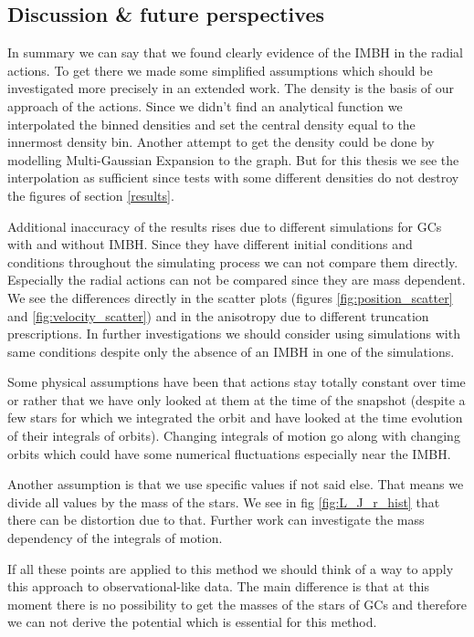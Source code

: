 \subsection{Discussion \& future perspectives}
In summary we can say that we found clearly evidence of the \ac{IMBH} in the radial actions. To get there we made some simplified assumptions which should be investigated more precisely in an extended work. The density is the basis of our approach of the actions. Since we didn't find an analytical function we interpolated the binned densities and set the central density equal to the innermost density bin. Another attempt to get the density could be done by modelling Multi-Gaussian Expansion to the graph. But for this thesis we see the interpolation as sufficient since tests with some different densities do not destroy the figures of section \ref{results}. \par Additional inaccuracy of the results rises due to different simulations for \acp{GC} with and without \ac{IMBH}. Since they have different initial conditions and conditions throughout the simulating process we can not compare them directly. Especially the radial actions can not be compared since they are mass dependent. We see the differences directly in the scatter plots (figures \ref{fig:position_scatter} and \ref{fig:velocity_scatter}) and in the anisotropy due to different truncation prescriptions. In further investigations we should consider using simulations with same conditions despite only the absence of an \ac{IMBH} in one of the simulations. \par Some physical assumptions have been that actions stay totally constant over time or rather that we have only looked at them at the time of the snapshot (despite a few stars for which we integrated the orbit and have looked at the time evolution of their integrals of orbits). Changing integrals of motion go along with changing orbits which could have some numerical fluctuations especially near the \ac{IMBH}. \par Another assumption is that we use specific values if not said else. That means we divide all values by the mass of the stars. We see in fig \ref{fig:L_J_r_hist} that there can be distortion due to that. Further work can investigate the mass dependency of the integrals of motion. \par If all these points are applied to this method we should think of a way to apply this approach to observational-like data. The main difference is that at this moment there is no possibility to get the masses of the stars of \acp{GC} and therefore we can not derive the potential which is essential for this method. 




